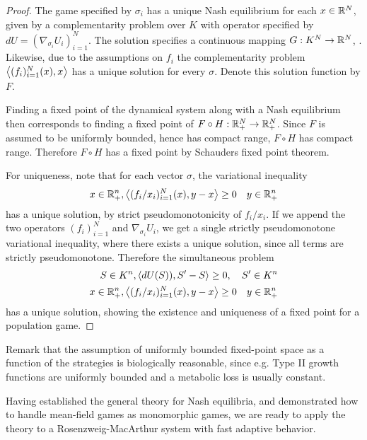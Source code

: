\begin{proof}
  The game specified by $\sigma_i$ has a unique Nash equilibrium for each $x\in \mathbb{R}^N$, given by a complementarity problem over $K$ with operator specified by $dU = (\nabla_{\sigma_i} U_i)_{i=1}^N$. The solution specifies a continuous mapping $G: K^N \to \mathbb{R}^N$, \cite[Theorem 4.2]{barbagallo2009continuity}. Likewise, due to the assumptions on $f_i$ the complementarity problem $\left \langle (f_i)_{i=1}^N(x),x \right \rangle$ has a unique solution for every $\sigma$. Denote this solution function by $F$.

  Finding a fixed point of the dynamical system along with a Nash equilibrium then corresponds to finding a fixed point of $F\circ H: \mathbb{R}_+^N \to \mathbb{R}_+^N$. Since $F$ is assumed to be uniformly bounded, hence has compact range, $F\circ H$ has compact range. Therefore $F\circ H$ has a fixed point by Schauders fixed point theorem.

  For uniqueness, note that for each vector $\sigma$, the variational inequality
  \begin{equation}
    x \in \mathbb{R}_+^n, \left \langle (f_i/x_i)_{i=1}^N(x),y-x \right \rangle\geq 0 \quad y\in \mathbb{R}_+^n
  \end{equation}
  has a unique solution, by strict pseudomonotonicity of $f_i/x_i$. If we append the two operators $(f_i)_{i=1}^N$ and $\nabla_{\sigma_i} U_i$, we get a single strictly pseudomonotone variational inequality, where there exists a unique solution, since all terms are strictly pseudomonotone.
 Therefore the simultaneous problem
\begin{equation}
  \begin{split}
  S\in K^n, \left \langle dU(S)),S'-S \right \rangle \geq 0, \quad S' \in K^n \\
  x \in \mathbb{R}_+^n, \left \langle (f_i/x_i)_{i=1}^N(x),y-x \right \rangle\geq 0 \quad y\in \mathbb{R}_+^n
\end{split}
\end{equation}
  has a unique solution, showing the existence and uniqueness of a fixed point for a population game.
\end{proof}
Remark that the assumption of uniformly bounded fixed-point space as a function of the strategies is biologically reasonable, since e.g. Type II growth functions are uniformly bounded and a metabolic loss is usually constant.

Having established the general theory for Nash equilibria, and demonstrated how to handle mean-field games as monomorphic games, we are ready to apply the theory to a Rosenzweig-MacArthur system with fast adaptive behavior.

